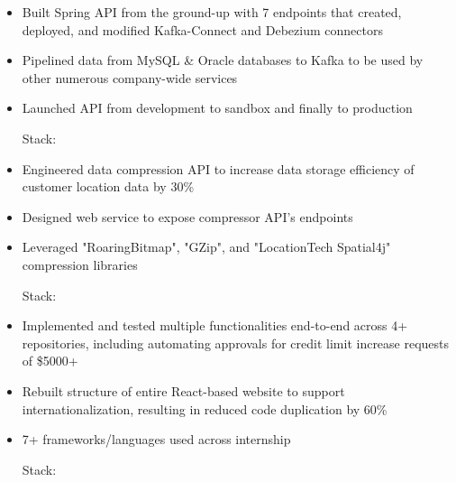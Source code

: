 \documentclass[10pt,a4paper,ragged2e,withhyper]{altacv}
\begin{document}
\begin{paracol}{2}

\begin{itemize}
\item Built Spring API from the ground-up with 7 endpoints that created, deployed, and modified Kafka-Connect and Debezium connectors
\item Pipelined data from MySQL \& Oracle databases to Kafka to be used by other numerous company-wide services
\item Launched API from development to sandbox and finally to production

\smallskip
Stack:

\end{itemize}

\divider

\begin{itemize}
\item Engineered data compression API to increase data storage efficiency of customer location data by 30\%
\item Designed web service to expose compressor API’s endpoints
\item Leveraged "RoaringBitmap", "GZip", and "LocationTech Spatial4j" compression libraries

\smallskip
Stack:

\end{itemize}

\divider

\begin{itemize}
\item Implemented and tested multiple functionalities end-to-end across 4+ repositories, including automating approvals for credit limit increase requests of \$5000+
\item Rebuilt structure of entire React-based website to support internationalization, resulting in reduced code duplication by 60\%
\item 7+ frameworks/languages used across internship

\smallskip
Stack:


\end{itemize}
\end{paracol}
\end{document}
